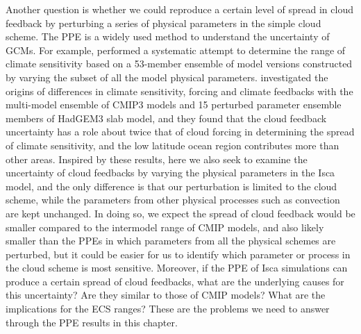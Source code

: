 Another question is whether we could reproduce a certain level of spread in cloud feedback by perturbing a series of physical parameters in the simple cloud scheme. The PPE is a widely used method to understand the uncertainty of GCMs. For example, \cite{Murphy2004quantification} performed a systematic attempt to determine the range of climate sensitivity based on a 53-member ensemble of model versions constructed by varying the subset of all the model physical parameters. \cite{Webb2013origins} investigated the origins of differences in climate sensitivity, forcing and climate feedbacks with the multi-model ensemble of CMIP3 models and 15 perturbed parameter ensemble members of HadGEM3 slab model, and they found that the cloud feedback uncertainty has a role about twice that of cloud forcing in determining the spread of climate sensitivity, and the low latitude ocean region contributes more than other areas. Inspired by these results, here we also seek to examine the uncertainty of cloud feedbacks by varying the physical parameters in the Isca model, and the only difference is that our perturbation is limited to the cloud scheme, while the parameters from other physical processes such as convection are kept unchanged. In doing so, we expect the spread of cloud feedback would be smaller compared to the intermodel range of CMIP models, and also likely smaller than the PPEs in which parameters from all the physical schemes are perturbed, but it could be easier for us to identify which parameter or process in the cloud scheme is most sensitive. Moreover, if the PPE of Isca simulations can produce a certain spread of cloud feedbacks, what are the underlying causes for this uncertainty? Are they similar to those of CMIP models? What are the implications for the ECS ranges? These are the problems we need to answer through the PPE results in this chapter.


